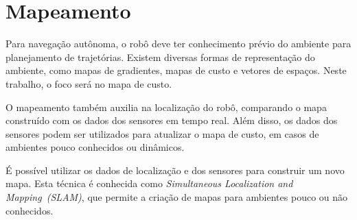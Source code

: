 \documentclass[repeatfields,xlists,xpacks,oneside,yearsonly]{ufrgscca}
\begin{document}




\section{Mapeamento}

Para navegação autônoma, o robô deve ter conhecimento prévio do ambiente
para planejamento de trajetórias.
Existem diversas formas de representação do ambiente,
como mapas de gradientes, mapas de custo e vetores de espaços.
Neste trabalho, o foco será no mapa de custo.

O mapeamento também auxilia na localização do robô, comparando o mapa construído
com os dados dos sensores em tempo real. Além disso, os dados dos sensores podem ser
utilizados para atualizar o mapa de custo, em casos de ambientes pouco conhecidos ou dinâmicos.

É possível utilizar os dados de localização e dos sensores para construir um novo mapa.
Esta técnica é conhecida como \textit{Simultaneous Localization and Mapping~(SLAM)},
que permite a criação de mapas para ambientes pouco ou não conhecidos.
\end{document}
